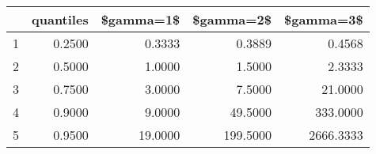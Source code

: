 \begin{table}[ht]
\centering
\begin{tabular}{rrrrr}
  \hline
 & quantiles & \$gamma=1\$ & \$gamma=2\$ & \$gamma=3\$ \\ 
  \hline
1 & 0.2500 & 0.3333 & 0.3889 & 0.4568 \\ 
  2 & 0.5000 & 1.0000 & 1.5000 & 2.3333 \\ 
  3 & 0.7500 & 3.0000 & 7.5000 & 21.0000 \\ 
  4 & 0.9000 & 9.0000 & 49.5000 & 333.0000 \\ 
  5 & 0.9500 & 19.0000 & 199.5000 & 2666.3333 \\ 
   \hline
\end{tabular}
\end{table}
